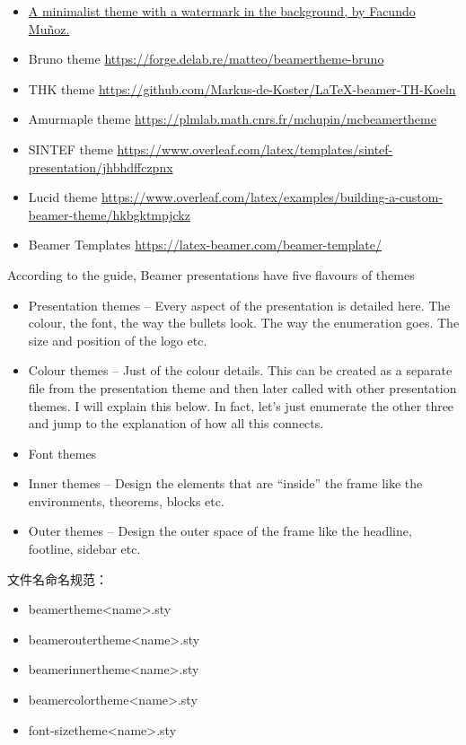 \begin{column}{0.5\textwidth}
\begin{itemize}
  \item \href{https://github.com/famuvie/beamerthemesimple}{A minimalist theme with a watermark in the background, by Facundo Muñoz.}
  \item Bruno theme \url{https://forge.delab.re/matteo/beamertheme-bruno}
  \item THK theme \url{https://github.com/Markus-de-Koster/LaTeX-beamer-TH-Koeln}
  \item Amurmaple theme \url{https://plmlab.math.cnrs.fr/mchupin/mcbeamertheme}
  \item SINTEF theme \url{https://www.overleaf.com/latex/templates/sintef-presentation/jhbhdffczpnx}
  \item Lucid theme \url{https://www.overleaf.com/latex/examples/building-a-custom-beamer-theme/hkbgktmpjckz}
  \item Beamer Templates \url{https://latex-beamer.com/beamer-template/}
\end{itemize}

According to the guide, Beamer presentations have five flavours of themes

\begin{itemize}
  \item Presentation themes – Every aspect of the presentation is detailed here. The colour, the font, the way the bullets look. The way the enumeration goes. The size and position of the logo etc.
  \item Colour themes – Just of the colour details. This can be created as a separate file from the presentation theme and then later called with other presentation themes. I will explain this below. In fact, let’s just enumerate the other three and jump to the explanation of how all this connects.
  \item Font themes
  \item Inner themes – Design the elements that are “inside” the frame like the environments, theorems, blocks etc.
  \item Outer themes – Design the outer space of the frame like the headline, footline, sidebar etc. 
\end{itemize}

文件名命名规范：
\begin{itemize}
  \item beamertheme<name>.sty
  \item beameroutertheme<name>.sty
  \item beamerinnertheme<name>.sty
  \item beamercolortheme<name>.sty
  \item font-sizetheme<name>.sty
\end{itemize}


\end{column}
